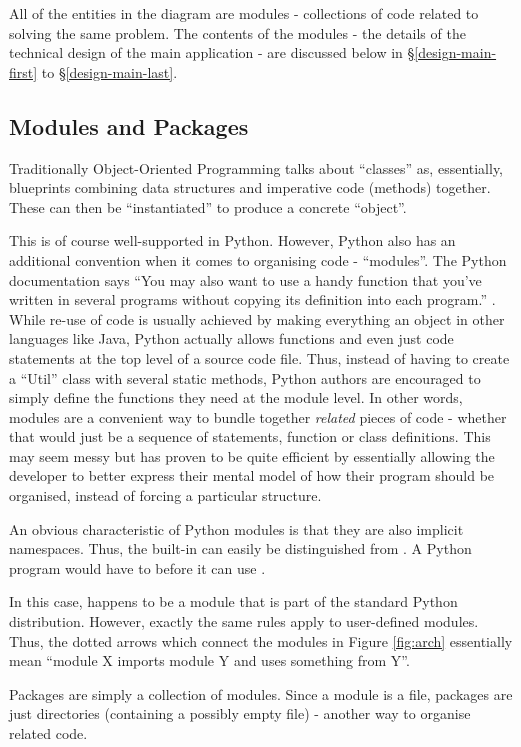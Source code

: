 All of the entities in the diagram are modules - collections of code related to solving the same problem. The contents of the modules - the details of the technical design of the main application - are discussed below in \S\ref{design-main-first} to \S\ref{design-main-last}.

\subsection{Modules and Packages}
Traditionally Object-Oriented Programming talks about ``classes'' as, essentially, blueprints combining data structures and imperative code (methods) together. These can then be ``instantiated'' to produce a concrete ``object''.

This is of course well-supported in Python. However, Python also has an additional convention when it comes to organising code - ``modules''. The Python documentation says ``You may also want to use a handy function that you’ve written in several programs without copying its definition into each program.'' \cite{python-doc-modules}. While re-use of code is usually achieved by making everything an object in other languages like Java, Python actually allows functions and even just code statements at the top level of a source code file. Thus, instead of having to create a ``Util'' class with several static methods, Python authors are encouraged to simply define the functions they need at the module level. In other words, modules are a convenient way to bundle together \emph{related} pieces of code - whether that would just be a sequence of statements, function or class definitions. This may seem messy but has proven to be quite efficient by essentially allowing the developer to better express their mental model of how their program should be organised, instead of forcing a particular structure.

An obvious characteristic of Python modules is that they are also implicit namespaces. Thus, the built-in  can easily be distinguished from . A Python program would have to  before it can use .

In this case,  happens to be a module that is part of the standard Python distribution. However, exactly the same rules apply to user-defined modules. Thus, the dotted arrows which connect the modules in Figure \ref{fig:arch} essentially mean ``module X imports module Y and uses something from Y''.

Packages are simply a collection of modules. Since a module is a file, packages are just directories (containing a possibly empty  file) - another way to organise related code.

